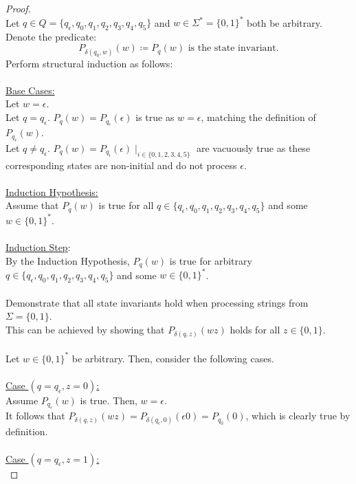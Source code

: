 \documentclass[12pt]{article}
\begin{document}
\begin{proof}
    \\
    Let $q \in Q = \{q_{\epsilon}, q_0, q_1, q_2, q_3, q_4, q_5\}$ and $w \in \Sigma^* = \{0, 1\}^*$ both be arbitrary. \\
    Denote the predicate:
    \[
        P_{\delta(q_0, w)}(w) \coloneqq P_q(w) \text{ is the state invariant.}
    \]
    Perform structural induction as follows: \\
    \\
    \underline{Base Cases:} \\
    Let $w = \epsilon$. \\
    Let $q = q_{\epsilon}$. $P_q(w) = P_{q_{\epsilon}}(\epsilon)$ is true as $w = \epsilon$, matching the definition of $P_{q_{\epsilon}}(w)$. \\
    Let $q \neq q_{\epsilon}$. $P_q(w) = P_{q_i}(\epsilon) \mid_{i \in \{0, 1, 2, 3, 4, 5\}}$ are vacuously true as these corresponding states are non-initial and do not process $\epsilon$. \\
    \\
    \underline{Induction Hypothesis:} \\
    Assume that $P_q(w)$ is true for all $q \in \{q_{\epsilon}, q_0, q_1, q_2, q_3, q_4, q_5\}$ and some $w \in \{0, 1\}^*$. \\
    \\
    \underline{Induction Step}: \\
    By the Induction Hypothesis, $P_q(w)$ is true for arbitrary $q \in \{q_{\epsilon}, q_0, q_1, q_2, q_3, q_4, q_5\}$ and some $w \in \{0, 1\}^*$. \\
    \\
    Demonstrate that all state invariants hold when processing strings from $\Sigma = \{0, 1\}$. \\
    This can be achieved by showing that $P_{\delta(q, z)}(wz)$ holds for all $z \in \{0, 1\}$. \\
    \\
    Let $w \in \{0, 1\}^*$ be arbitrary. Then, consider the following cases. \\
    \\
    \underline{Case $(q = q_{\epsilon}, z = 0)$:} \\
    Assume $P_{q_{\epsilon}}(w)$ is true. Then, $w = \epsilon$. \\
    It follows that $P_{\delta(q, z)}(wz) = P_{\delta(q_{\epsilon}, 0)}(\epsilon 0) = P_{q_0}(0)$, which is clearly true by definition. \\
    \\
    \underline{Case $(q = q_{\epsilon}, z = 1)$:} \\

\end{proof}
\end{document}
